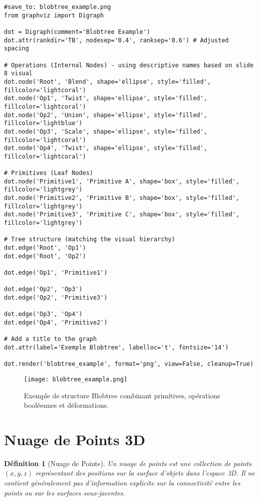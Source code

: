 \documentclass{article}
\newtheorem{definition}{Définition}
\begin{document}
\begin{verbatim}
#save_to: blobtree_example.png
from graphviz import Digraph

dot = Digraph(comment='Blobtree Example')
dot.attr(rankdir='TB', nodesep='0.4', ranksep='0.6') # Adjusted spacing

# Operations (Internal Nodes) - using descriptive names based on slide 8 visual
dot.node('Root', 'Blend', shape='ellipse', style='filled', fillcolor='lightcoral')
dot.node('Op1', 'Twist', shape='ellipse', style='filled', fillcolor='lightcoral')
dot.node('Op2', 'Union', shape='ellipse', style='filled', fillcolor='lightblue')
dot.node('Op3', 'Scale', shape='ellipse', style='filled', fillcolor='lightcoral')
dot.node('Op4', 'Twist', shape='ellipse', style='filled', fillcolor='lightcoral')

# Primitives (Leaf Nodes)
dot.node('Primitive1', 'Primitive A', shape='box', style='filled', fillcolor='lightgrey')
dot.node('Primitive2', 'Primitive B', shape='box', style='filled', fillcolor='lightgrey')
dot.node('Primitive3', 'Primitive C', shape='box', style='filled', fillcolor='lightgrey')

# Tree structure (matching the visual hierarchy)
dot.edge('Root', 'Op1')
dot.edge('Root', 'Op2')

dot.edge('Op1', 'Primitive1')

dot.edge('Op2', 'Op3')
dot.edge('Op2', 'Primitive3')

dot.edge('Op3', 'Op4')
dot.edge('Op4', 'Primitive2')

# Add a title to the graph
dot.attr(label='Exemple Blobtree', labelloc='t', fontsize='14')

dot.render('blobtree_example', format='png', view=False, cleanup=True)
\end{verbatim}

\begin{figure}[H]
\centering
\texttt{[image: blobtree\_example.png]} %
\caption{Exemple de structure Blobtree combinant primitives, opérations booléennes et déformations.}
\label{fig:blobtree}
\end{figure}


\section{Nuage de Points 3D}

\begin{definition}[Nuage de Points]
Un nuage de points est une collection de points $(x, y, z)$ représentant des positions sur la surface d'objets dans l'espace 3D. Il ne contient généralement pas d'information explicite sur la connectivité entre les points ou sur les surfaces sous-jacentes.
\end{definition}
\end{document}
